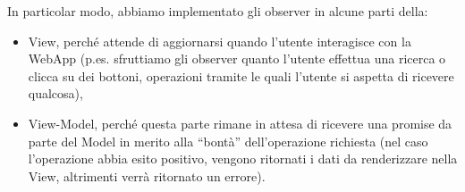 In particolar modo, abbiamo implementato gli observer in alcune parti della:
\begin{itemize}
\item View, perché attende di aggiornarsi quando l’utente interagisce con la WebApp (p.es. sfruttiamo gli observer quanto l'utente effettua una ricerca o clicca su dei bottoni, operazioni tramite le quali l'utente si aspetta di ricevere qualcosa),
\item View-Model, perché questa parte rimane in attesa di ricevere una promise da parte del Model in merito alla “bontà” dell’operazione richiesta (nel caso l’operazione abbia esito positivo, vengono ritornati i dati da renderizzare nella View, altrimenti verrà ritornato un errore).
\end{itemize}